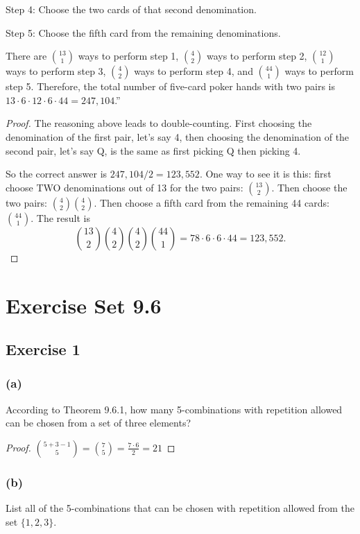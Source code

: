 \documentclass[14pt]{extarticle}
\newcommand{\dps}{\displaystyle}
\newcommand{\cy}{\color{cyan}}
\begin{document}
{\cy Step 4:} Choose the two cards of that second denomination.

{\cy Step 5:} Choose the fifth card from the remaining denominations.

There are \(\binom{13}{1}\) ways to perform step 1, \(\binom{4}{2}\) ways to perform step 2, \(\binom{12}{1}\) ways 
to perform step 3, \(\binom{4}{2}\) ways to perform step 4, and \(\binom{44}{1}\) ways to perform step 5. Therefore, the 
total number of five-card poker hands with two pairs is \(13 \cdot 6 \cdot 12 \cdot 6 \cdot 44 = 247,104\).”

\begin{proof}
The reasoning above leads to double-counting. First choosing the denomination of the first pair, let's say 4, then choosing
the denomination of the second pair, let's say Q, is the same as first picking Q then picking 4.

So the correct answer is \(247,104 / 2 = 123,552\). One way to see it is this: first choose TWO denominations out of 13 for
the two pairs: \(\binom{13}{2}\). Then choose the two pairs: \(\binom{4}{2}\binom{4}{2}\). Then choose a fifth card from the
remaining 44 cards: \(\binom{44}{1}\). The result is
\[
\binom{13}{2}\binom{4}{2}\binom{4}{2}\binom{44}{1} = 78 \cdot 6 \cdot 6 \cdot 44 = 123,552.
\]
\end{proof}

\section{Exercise Set 9.6}
\subsection{Exercise 1}
\subsubsection{(a)}
According to Theorem 9.6.1, how many 5-combinations with repetition allowed can be chosen from a set of three elements?

\begin{proof}
\(\dps \binom{5+3-1}{5} = \binom{7}{5} = \frac{7 \cdot 6}{2} = 21\)
\end{proof}

\subsubsection{(b)}
List all of the 5-combinations that can be chosen with repetition allowed from the set \(\{1, 2, 3\}\).
\end{document}
